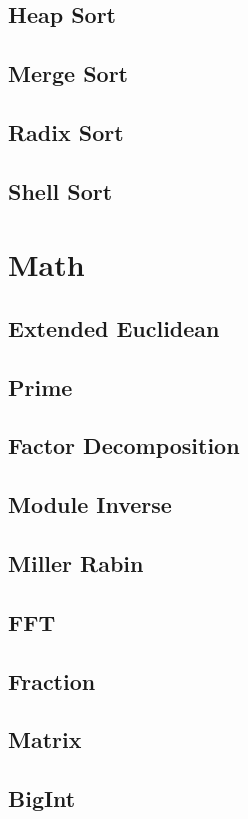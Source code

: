 \documentclass[a4paper,10pt,twocolumn,oneside]{article}
\begin{document}
\subsection{Heap Sort}

\subsection{Merge Sort}

\subsection{Radix Sort}

\subsection{Shell Sort}

\newpage
\section{Math}
\subsection{Extended Euclidean}

\subsection{Prime}

\subsection{Factor Decomposition}

\subsection{Module Inverse}

\subsection{Miller Rabin}

\subsection{FFT}

\subsection{Fraction}

\subsection{Matrix}

\subsection{BigInt}

\newpage

\clearpage
\end{document}
